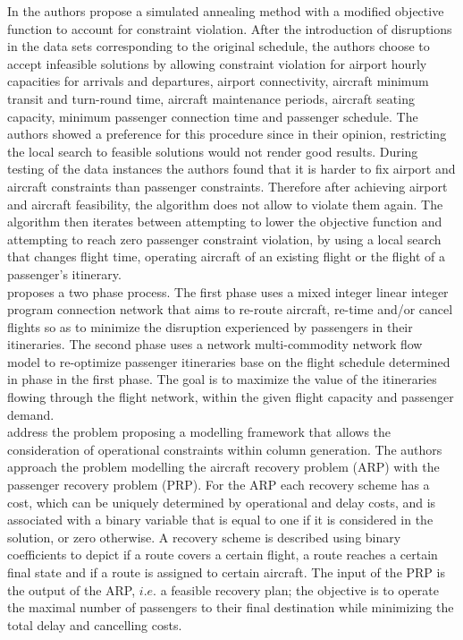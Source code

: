 \documentclass[ijoo,nonblindrev]{informs-ijoo}
\begin{document}
In \citep{peekstok2009} the authors propose a simulated annealing method with a modified objective function to account for constraint violation. After the introduction of disruptions in the data sets corresponding to the original schedule, the authors choose to accept infeasible solutions by allowing constraint violation for airport hourly capacities for arrivals and departures, airport connectivity, aircraft minimum transit and turn-round time, aircraft maintenance periods, aircraft seating capacity, minimum passenger connection time and passenger schedule. The authors showed a preference for this procedure since in their opinion, restricting the local search to feasible solutions would not render good results. During testing of the data instances the authors found that it is harder to fix airport and aircraft constraints than passenger constraints. Therefore after achieving airport and aircraft feasibility, the algorithm does not allow to violate them again. The algorithm then iterates between attempting to lower the objective function and attempting to reach zero passenger constraint violation, by using a local search that changes flight time, operating aircraft of an existing flight or the flight of a passenger’s itinerary.\\
\citep{dickson2009} proposes a two phase process. The first phase uses a mixed integer linear integer program connection network that aims to re-route aircraft, re-time and/or cancel flights so as to minimize the disruption experienced by passengers in their itineraries. The second phase uses a network multi-commodity network flow model to re-optimize passenger itineraries base on the flight schedule determined in phase in the first phase. The goal is to maximize the value of the itineraries flowing through the flight network, within the given flight capacity and passenger demand.\\
\citep{eggenberg2009} address the problem proposing a modelling framework that allows the consideration of operational constraints within column generation. The authors approach the problem modelling the aircraft recovery problem (ARP) with the passenger recovery problem (PRP). For the ARP each recovery scheme has a cost, which can be uniquely determined by operational and delay costs, and is associated with a binary variable that is equal to one if it is considered in the solution, or zero otherwise. A recovery scheme is described using binary coefficients to depict if a route covers a  certain flight, a route reaches a certain final state and if a route is assigned to certain aircraft. The input of the PRP is the output of the ARP, $i.e.$ a feasible recovery plan; the objective is to operate the maximal number of passengers to their final destination while minimizing the total delay and cancelling costs.
\end{document}
